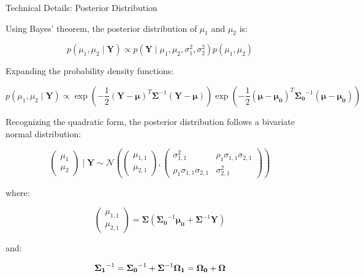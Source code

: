 \begin{frame}{Technical Details: Posterior Distribution}

Using Bayes' theorem, the posterior distribution of $\mu_1$ and $\mu_2$ is:

$$
p(\mu_1, \mu_2 \mid \mathbf{Y}) \propto p(\mathbf{Y} \mid \mu_1, \mu_2, \sigma_1^2, \sigma_2^2) p(\mu_1, \mu_2)
$$

Expanding the probability density functions:

$$
p(\mu_1, \mu_2 \mid \mathbf{Y}) \propto \exp\left( -\frac{1}{2} (\mathbf{Y} - \boldsymbol{\mu})^T \boldsymbol{\Sigma}^{-1} (\mathbf{Y} - \boldsymbol{\mu}) \right)
\exp\left( -\frac{1}{2} (\boldsymbol{\mu} - \boldsymbol{\mu_0})^T \boldsymbol{\Sigma_0}^{-1} (\boldsymbol{\mu} - \boldsymbol{\mu_0}) \right)
$$

Recognizing the quadratic form, the posterior distribution follows a bivariate normal distribution:

$$
\begin{pmatrix}
\mu_1 \\
\mu_2
\end{pmatrix}
\mid \mathbf{Y} \sim \mathcal{N}
\left( 
\begin{pmatrix}
\mu_{1,1} \\
\mu_{2,1}
\end{pmatrix},
\begin{pmatrix}
\sigma_{1,1}^2 & \rho_1 \sigma_{1,1} \sigma_{2,1} \\
\rho_1 \sigma_{1,1} \sigma_{2,1} & \sigma_{2,1}^2
\end{pmatrix}
\right)
$$

where:

$$
\begin{pmatrix}
\mu_{1,1} \\
\mu_{2,1}
\end{pmatrix}
= 
\boldsymbol{\Sigma} \left( \boldsymbol{\Sigma_0}^{-1} \boldsymbol{\mu_0} + \boldsymbol{\Sigma}^{-1} \mathbf{Y} \right)
$$

and:

$$
\boldsymbol{\Sigma_1}^{-1} = \boldsymbol{\Sigma_0}^{-1} + \boldsymbol{\Sigma}^{-1} \\
\boldsymbol{\Omega_1} = \boldsymbol{\Omega_0} + \boldsymbol{\Omega}
$$

\end{frame}

